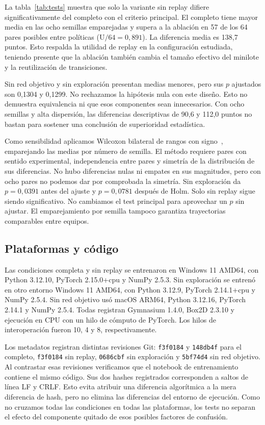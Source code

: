 \documentclass[conference]{IEEEtran}
\begin{document}
La tabla~\ref{tab:tests} muestra que solo la variante sin replay difiere significativamente del completo con el criterio principal. El completo tiene mayor media en las ocho semillas emparejadas y supera a la ablación en 57 de los 64 pares posibles entre políticas ($\mathrm{U}/64=0{,}891$). La diferencia media es 138,7 puntos. Esto respalda la utilidad de replay en la configuración estudiada, teniendo presente que la ablación también cambia el tamaño efectivo del minilote y la reutilización de transiciones.

Sin red objetivo y sin exploración presentan medias menores, pero sus $p$ ajustados son 0,1304 y 0,1299. No rechazamos la hipótesis nula con este diseño. Esto no demuestra equivalencia ni que esos componentes sean innecesarios. Con ocho semillas y alta dispersión, las diferencias descriptivas de 90,6 y 112,0 puntos no bastan para sostener una conclusión de superioridad estadística.

Como sensibilidad aplicamos Wilcoxon bilateral de rangos con signo~\cite{wilcoxon1945}, emparejando las medias por número de semilla. El método requiere pares con sentido experimental, independencia entre pares y simetría de la distribución de sus diferencias. No hubo diferencias nulas ni empates en sus magnitudes, pero con ocho pares no podemos dar por comprobada la simetría. Sin exploración da $p=0{,}0391$ antes del ajuste y $p=0{,}0781$ después de Holm. Solo sin replay sigue siendo significativo. No cambiamos el test principal para aprovechar un $p$ sin ajustar. El emparejamiento por semilla tampoco garantiza trayectorias comparables entre equipos.

\balance
\subsection{Plataformas y código}
Las condiciones completa y sin replay se entrenaron en Windows 11 AMD64, con Python 3.12.10, PyTorch 2.15.0+cpu y NumPy 2.5.3. Sin exploración se entrenó en otro entorno Windows 11 AMD64, con Python 3.12.9, PyTorch 2.14.1+cpu y NumPy 2.5.4. Sin red objetivo usó macOS ARM64, Python 3.12.16, PyTorch 2.14.1 y NumPy 2.5.4. Todas registran Gymnasium 1.4.0, Box2D 2.3.10 y ejecución en CPU con un hilo de cómputo de PyTorch. Los hilos de interoperación fueron 10, 4 y 8, respectivamente.

Los metadatos registran distintas revisiones Git: \texttt{f3f0184} y \texttt{148db4f} para el completo, \texttt{f3f0184} sin replay, \texttt{0686cbf} sin exploración y \texttt{5bf74d4} sin red objetivo. Al contrastar esas revisiones verificamos que el notebook de entrenamiento contiene el mismo código. Sus dos hashes registrados corresponden a saltos de línea LF y CRLF. Esto evita atribuir una diferencia algorítmica a la mera diferencia de hash, pero no elimina las diferencias del entorno de ejecución. Como no cruzamos todas las condiciones en todas las plataformas, los tests no separan el efecto del componente quitado de esos posibles factores de confusión.
\end{document}

